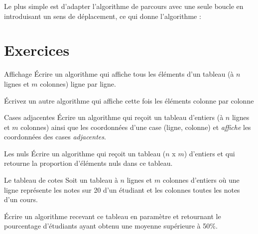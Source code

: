 			Le plus simple est d'adapter l'algorithme de parcours 
			avec une seule boucle
			en introduisant un sens de déplacement, 
			ce qui donne l'algorithme :
			
			\begin{algo}
			\end{algo}

\section{Exercices}

	\begin{Exercice}{Affichage}
		Écrire un algorithme qui affiche tous les éléments d'un
		tableau (à $n$ lignes et $m$ colonnes) ligne par ligne.
		
		Écrivez un autre algorithme qui affiche cette fois les éléments
		colonne par colonne
	\end{Exercice}
	
	\begin{Exercice}{Cases adjacentes}
		Écrire un algorithme qui reçoit un tableau d'entiers
		(à $n$ lignes et $m$ colonnes)
		ainsi que les coordonnées d'une case (ligne, colonne)
		et \emph{affiche} les coordonnées
		des cases \emph{adjacentes}.		
	\end{Exercice}
	
	\begin{Exercice}{Les nuls}
		Écrire un algorithme qui reçoit un tableau ($n$ x $m$)
		d'entiers et qui retourne la proportion
		d'éléments nuls dans ce tableau.
	\end{Exercice}
	
	\begin{Exercice}{Le tableau de cotes}
		Soit un tableau à $n$ lignes et $m$ colonnes d'entiers où
		une ligne représente les notes sur 20 d'un étudiant et
		les colonnes toutes les notes d'un cours.
		
		Écrire un algorithme recevant ce tableau en paramètre et retournant le
		pourcentage d'étudiants ayant obtenu une moyenne
		supérieure à 50\%.
	\end{Exercice}
	
